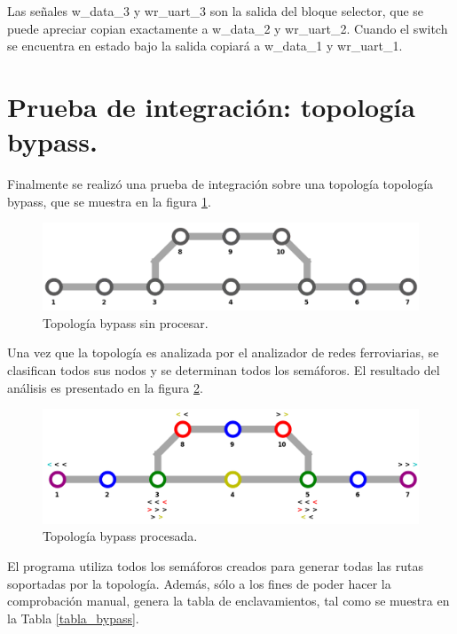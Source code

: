 	\vspace{5cm}
			
	Las señales w\_data\_3 y wr\_uart\_3 son la salida del bloque selector, que se puede apreciar copian exactamente a w\_data\_2 y wr\_uart\_2. Cuando el switch se encuentra en estado bajo la salida copiará a w\_data\_1 y wr\_uart\_1.
	
\section{Prueba de integración: topología bypass.}

	Finalmente se realizó una prueba de integración sobre una topología topología bypass, que se muestra en la figura \ref{fig:Bypass_1}.

	\begin{figure}[h]
	\centering
	\includegraphics[scale=0.5]{./Figures/Mapa_2_B}
		\caption{Topología bypass sin procesar.}
		\label{fig:Bypass_1}
	\end{figure}
	
	Una vez que la topología es analizada por el analizador de redes ferroviarias, se clasifican todos sus nodos y se determinan todos los semáforos. El resultado del análisis es presentado en la figura \ref{fig:Bypass_2}.

	\begin{figure}[h]
	\centering
	\includegraphics[scale=0.5]{./Figures/Mapa_2}
		\caption{Topología bypass procesada.}
		\label{fig:Bypass_2}
	\end{figure}
	
	El programa utiliza todos los semáforos creados para generar todas las rutas soportadas por la topología. Además, sólo a los fines de poder hacer la comprobación manual, genera la tabla de enclavamientos, tal como se muestra en la Tabla \ref{tabla_bypass}.

